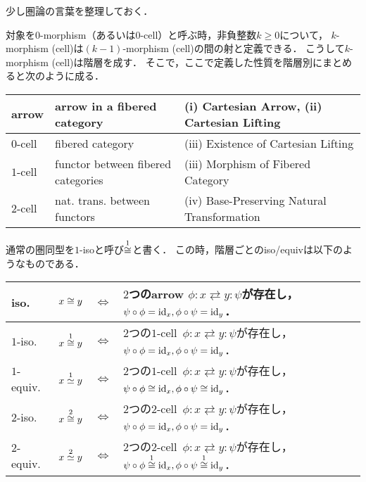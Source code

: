 \begin{Remark}
    少し圏論の言葉を整理しておく．

    対象を$0$-morphism（あるいは$0$-cell）と呼ぶ時，非負整数$k \geq 0$について，
    $k$-morphism (cell)は$(k-1)$-morphism (cell)の間の射と定義できる．
    こうして$k$-morphism (cell)は階層を成す．
    そこで，ここで定義した性質を階層別にまとめると次のように成る．
    \begin{center}
    \begin{tabular}{l|l|l}
        \hline
        arrow& arrow in a fibered category & (i) Cartesian Arrow, (ii) Cartesian Lifting \\ \hline\hline
        $0$-cell& fibered category & (iii) Existence of Cartesian Lifting \\ \hline
        $1$-cell& functor between fibered categories & (iii) Morphism of Fibered Category \\ \hline
        $2$-cell& nat. trans. between functors & (iv) Base-Preserving Natural Transformation \\
        \hline
    \end{tabular}
    \end{center}

    通常の圏同型を$1$-isoと呼び$\kiso[1]$と書く．
    この時，階層ごとのiso/equivは以下のようなものである．
    \begin{center}
        \begin{tabular}{lccl}
            iso. & $x \iso y$& $\iff$ &
                $2$つのarrow $\phi \colon x \rightleftarrows y \colon \psi$が存在し， 
                $\psi \circ \phi=\id[x], \phi \circ \psi=\id[y]$．\\ \hline\hline
            $1$-iso. & $x \kiso[1] y$& $\iff$ &
                $2$つの$1$-cell \,$\phi \colon x \rightleftarrows y \colon \psi$が存在し， 
                $\psi \circ \phi=\id[x], \phi \circ \psi=\id[y]$．\\
            $1$-equiv. & $x \kequiv[1] y$& $\iff$ &
                $2$つの$1$-cell \,$\phi \colon x \rightleftarrows y \colon \psi$が存在し， 
                $\psi \circ \phi \kiso \id[x], \phi \circ \psi \kiso \id[y]$．\\ \hline
            $2$-iso. & $x \kiso[2] y$& $\iff$ &
                $2$つの$2$-cell \,$\phi \colon x \rightleftarrows y \colon \psi$が存在し， 
                $\psi \circ \phi=\id[x], \phi \circ \psi=\id[y]$．\\
            $2$-equiv. & $x \kequiv[2] y$& $\iff$ &
                $2$つの$2$-cell \,$\phi \colon x \rightleftarrows y \colon \psi$が存在し， 
                $\psi \circ \phi \kiso[1] \id[x], \phi \circ \psi \kiso[1] \id[y]$．\\
        \end{tabular}
    \end{center}
\end{Remark}

